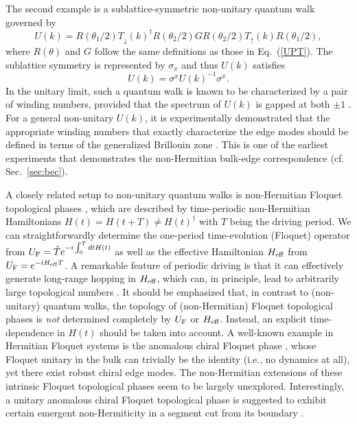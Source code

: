 \documentclass{tADP2e}
\theoremstyle{plain}
\theoremstyle{plain}
\theoremstyle{definition}
\begin{document}
The second example is a sublattice-symmetric non-unitary quantum walk governed by \cite{LX20} 
\begin{equation}
U(k)=R(\theta_1/2) T_\downarrow(k)^\dag R(\theta_2/2) G R(\theta_2/2)  T_\uparrow(k) R(\theta_1/2),
\end{equation}
where $R(\theta)$ and $G$ follow the same definitions as those in Eq.~(\ref{UPT}). The sublattice symmetry is represented by $\sigma_x$ and thus $U(k)$ satisfies
\begin{equation}
U(k) = \sigma^x U(k)^{-1}\sigma^x. 
\end{equation}
In the unitary limit, such a quantum walk is known to be characterized by a pair of winding numbers, provided that the spectrum of $U(k)$ is gapped at both $\pm1$ \cite{AJK13}. For a general non-unitary $U(k)$, it is experimentally demonstrated that the appropriate winding numbers that exactly %
characterize the edge modes should be defined in terms of the generalized Brillouin zone \cite{LX20}. This is one of the earliest experiments that demonstrates the non-Hermitian bulk-edge correspondence (cf. Sec.~\ref{sec:bec}).




A closely related setup to non-unitary quantum walks is non-Hermitian Floquet topological phases \cite{CY15b,ZL18b,BH20b,ZL20,ZX20,HW20}, which are described by time-periodic non-Hermitian Hamiltonians $H(t)=H(t+T)\neq H(t)^\dag$ with $T$ being the driving period. We can straightforwardly determine the one-period time-evolution (Floquet) operator from $U_{\rm F}=\hat T e^{-i\int_0^T dt H(t)}$ as well as the effective Hamiltonian $H_{\rm eff}$ from $U_{\rm F}=e^{-iH_{\rm eff}T}$. A remarkable feature of periodic driving is that it can effectively generate long-range hopping in $H_{\rm eff}$, which can, in principle, lead to arbitrarily large topological numbers \cite{ZL18b,ZL20}.  
It should be emphasized that, in contrast to (non-unitary) quantum walks, the topology of (non-Hermitian) Floquet topological phases is \emph{not} determined completely by $U_{\rm F}$ or $H_{\rm eff}$. Instead, an explicit time-dependence in $H(t)$ should be taken into account. A well-known example in Hermitian Floquet systems is the anomalous chiral Floquet phase \cite{RMS13,PHC16,HF17b}, whose Floquet unitary in the bulk can trivially be the identity (i.e., no dynamics at all), yet there exist robust chiral edge modes. %
The non-Hermitian extensions of these intrinsic Floquet topological phases seem to be largely unexplored. 
Interestingly, a unitary anomalous chiral Floquet topological phase is suggested to exhibit certain emergent non-Hermiticity in %
a segment cut from its boundary \cite{BH20}.
\end{document}
